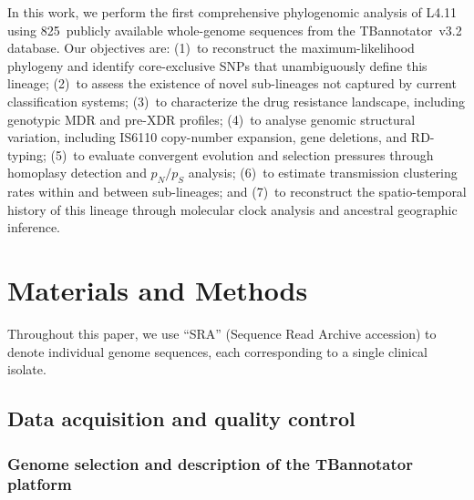 \documentclass[11pt,a4paper]{article}
\newcommand{\lignee}[1]{\textsf{#1}}
\begin{document}
In this work, we perform the first comprehensive phylogenomic analysis of
\lignee{L4.11} using 825~publicly available whole-genome sequences from the
TBannotator~v3.2 database.  Our objectives are:
(1)~to reconstruct the maximum-likelihood phylogeny and identify core-exclusive
SNPs that unambiguously define this lineage;
(2)~to assess the existence of novel sub-lineages not captured by current
classification systems;
(3)~to characterize the drug resistance landscape, including genotypic MDR and
pre-XDR profiles;
(4)~to analyse genomic structural variation, including IS6110 copy-number
expansion, gene deletions, and RD-typing;
(5)~to evaluate convergent evolution and selection pressures through homoplasy
detection and $p_N/p_S$ analysis;
(6)~to estimate transmission clustering rates within and between sub-lineages; and
(7)~to reconstruct the spatio-temporal history of this lineage through molecular clock analysis and ancestral geographic inference.


\section{Materials and Methods}
\label{sec:methods}

Throughout this paper, we use ``SRA'' (Sequence Read Archive accession)
to denote individual genome sequences, each corresponding to a single
clinical isolate.

\subsection{Data acquisition and quality control}

\subsubsection{Genome selection and description of the TBannotator platform}
\end{document}
